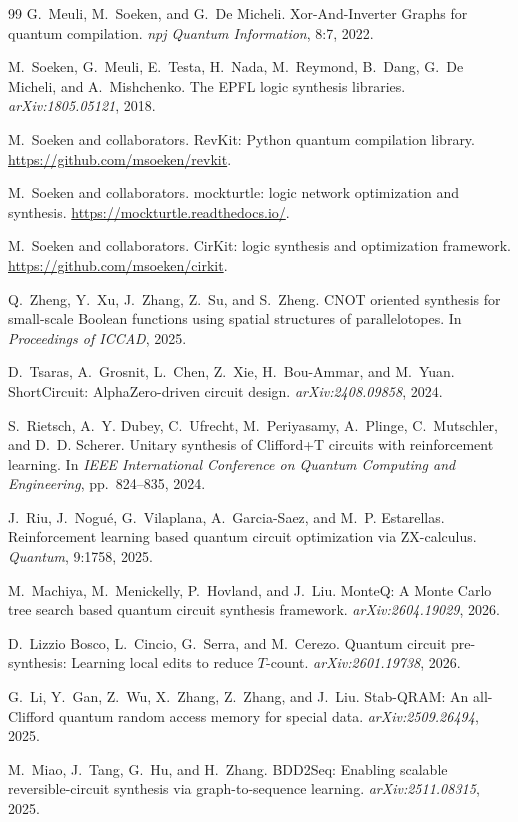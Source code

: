 \documentclass[UTF8,fontset=fandol,11pt]{ctexart}
\begin{document}
\begin{thebibliography}{99}
G.~Meuli, M.~Soeken, and G.~De Micheli.
\newblock Xor-And-Inverter Graphs for quantum compilation.
\newblock \emph{npj Quantum Information}, 8:7, 2022.

M.~Soeken, G.~Meuli, E.~Testa, H.~Nada, M.~Reymond, B.~Dang, G.~De Micheli, and A.~Mishchenko.
\newblock The EPFL logic synthesis libraries.
\newblock \emph{arXiv:1805.05121}, 2018.

M.~Soeken and collaborators.
\newblock RevKit: Python quantum compilation library.
\newblock \url{https://github.com/msoeken/revkit}.

M.~Soeken and collaborators.
\newblock mockturtle: logic network optimization and synthesis.
\newblock \url{https://mockturtle.readthedocs.io/}.

M.~Soeken and collaborators.
\newblock CirKit: logic synthesis and optimization framework.
\newblock \url{https://github.com/msoeken/cirkit}.

Q.~Zheng, Y.~Xu, J.~Zhang, Z.~Su, and S.~Zheng.
\newblock CNOT oriented synthesis for small-scale Boolean functions using spatial structures of parallelotopes.
\newblock In \emph{Proceedings of ICCAD}, 2025.

D.~Tsaras, A.~Grosnit, L.~Chen, Z.~Xie, H.~Bou-Ammar, and M.~Yuan.
\newblock ShortCircuit: AlphaZero-driven circuit design.
\newblock \emph{arXiv:2408.09858}, 2024.

S.~Rietsch, A.~Y. Dubey, C.~Ufrecht, M.~Periyasamy, A.~Plinge, C.~Mutschler, and D.~D. Scherer.
\newblock Unitary synthesis of Clifford+T circuits with reinforcement learning.
\newblock In \emph{IEEE International Conference on Quantum Computing and Engineering}, pp.~824--835, 2024.

J.~Riu, J.~Nogu{\'e}, G.~Vilaplana, A.~Garcia-Saez, and M.~P. Estarellas.
\newblock Reinforcement learning based quantum circuit optimization via ZX-calculus.
\newblock \emph{Quantum}, 9:1758, 2025.

M.~Machiya, M.~Menickelly, P.~Hovland, and J.~Liu.
\newblock MonteQ: A Monte Carlo tree search based quantum circuit synthesis framework.
\newblock \emph{arXiv:2604.19029}, 2026.

D.~Lizzio Bosco, L.~Cincio, G.~Serra, and M.~Cerezo.
\newblock Quantum circuit pre-synthesis: Learning local edits to reduce $T$-count.
\newblock \emph{arXiv:2601.19738}, 2026.

G.~Li, Y.~Gan, Z.~Wu, X.~Zhang, Z.~Zhang, and J.~Liu.
\newblock Stab-QRAM: An all-Clifford quantum random access memory for special data.
\newblock \emph{arXiv:2509.26494}, 2025.

M.~Miao, J.~Tang, G.~Hu, and H.~Zhang.
\newblock BDD2Seq: Enabling scalable reversible-circuit synthesis via graph-to-sequence learning.
\newblock \emph{arXiv:2511.08315}, 2025.

\end{thebibliography}
\end{document}
